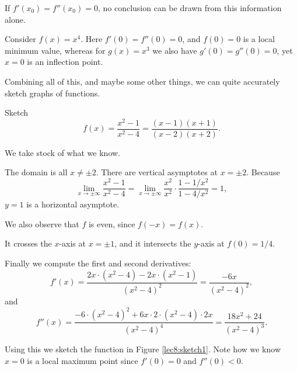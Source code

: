\begin{remark}
	If $f'(x_0) = f''(x_0) = 0$, no conclusion can be drawn from this information alone.
\end{remark}

\begin{example}
	Consider $f(x) = x^4$.
	Here $f'(0) = f''(0) = 0$, and $f(0) = 0$ is a local minimum value, whereas for $g(x) = x^3$ we also have $g'(0) = g''(0) = 0$, yet $x = 0$ is an inflection point.
\end{example}


Combining all of this, and maybe some other things, we can quite accurately sketch graphs of functions.

\begin{example}
	Sketch
	\[
		f(x) = \frac{x^2 - 1}{x^2 - 4} = \frac{(x - 1)(x + 1)}{(x - 2)(x + 2)}.
	\]

	\noindent
	We take stock of what we know.

	The domain is all $x \neq \pm 2$.
	There are vertical asymptotes at $x = \pm 2$.
	Because
	\[
		\lim_{x \to \pm \infty} \frac{x^2 - 1}{x^2 - 4} = \lim_{x \to \pm \infty} \frac{x^2}{x^2} \cdot \frac{1 - 1/x^2}{1 - 4/x^2} = 1,
	\]
	$y = 1$ is a horizontal asymptote.

	We also observe that $f$ is even, since $f(-x) = f(x)$.

	It crosses the $x$-axis at $x = \pm 1$, and it intersects the $y$-axis at $f(0) = 1/4$.

	Finally we compute the first and second derivatives:
	\[
		f'(x) = \frac{2x \cdot (x^2 - 4) - 2x \cdot (x^2 - 1)}{(x^2 - 4)^2} = \frac{- 6x}{(x^2 - 4)^2},
	\]
	and
	\[
		f''(x) = \frac{-6 \cdot (x^2 - 4)^2 + 6 x \cdot 2 \cdot (x^2 - 4) \cdot 2 x}{(x^2 - 4)^4} = \frac{18x^2 + 24}{(x^2 - 4)^3}.
	\]

	\noindent
	Using this we sketch the function in Figure \ref{lec8:sketch1}.
	Note how we know $x = 0$ is a local maximum point since $f'(0) = 0$ and $f''(0) < 0$.
\end{example}

